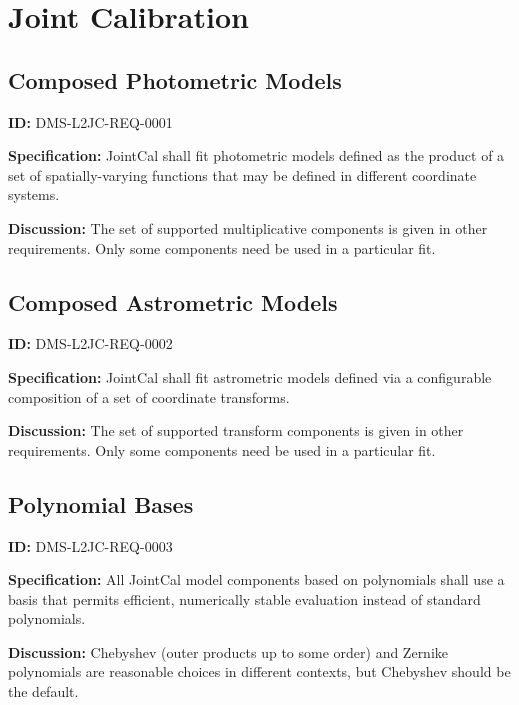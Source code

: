 \documentclass[SE,toc,lsstdraft]{lsstdoc}
\date{2017-09-11}
\begin{document}
\maketitle

\section{Joint Calibration}

\subsection{Composed Photometric Models}

\label{DMS-L2JC-REQ-0001}
\textbf{ID:} DMS-L2JC-REQ-0001

\textbf{Specification:}
JointCal shall fit photometric models defined as the product of a set of spatially-varying functions that may be defined in different coordinate systems.

\textbf{Discussion:}
The set of supported multiplicative components is given in other requirements.  Only some components need be used in a particular fit.

\subsection{Composed Astrometric Models}

\label{DMS-L2JC-REQ-0002}
\textbf{ID:} DMS-L2JC-REQ-0002

\textbf{Specification:}
JointCal shall fit astrometric models defined via a configurable composition of a set of coordinate transforms.

\textbf{Discussion:}
The set of supported transform components is given in other requirements.  Only some components need be used in a particular fit.

\subsection{Polynomial Bases}

\label{DMS-L2JC-REQ-0003}
\textbf{ID:} DMS-L2JC-REQ-0003

\textbf{Specification:}
All JointCal model components based on polynomials shall use a basis that permits efficient, numerically stable evaluation instead of standard polynomials.

\textbf{Discussion:}
Chebyshev (outer products up to some order) and Zernike polynomials are reasonable choices in different contexts, but Chebyshev should be the default.
\end{document}
